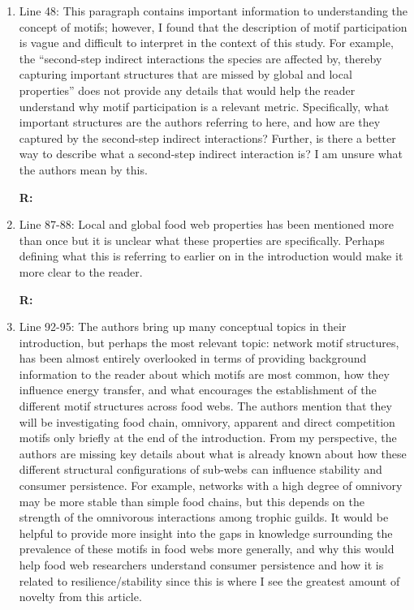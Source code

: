 \documentclass[12pt]{article}
\begin{document}
\begin{enumerate}
            \item Line 48: This paragraph contains important information to understanding the concept of motifs; however, I found that the description of motif participation is vague and difficult to interpret in the context of this study. For example, the “second-step indirect interactions the species are affected by, thereby capturing important structures that are missed by global and local properties” does not provide any details that would help the reader understand why motif participation is a relevant metric. Specifically, what important structures are the authors referring to here, and how are they captured by the second-step indirect interactions? Further, is there a better way to describe what a second-step indirect interaction is? I am unsure what the authors mean by this.

                \textbf{R:}

            
            \item Line 87-88: Local and global food web properties has been mentioned more than once but it is unclear what these properties are specifically. Perhaps defining what this is referring to earlier on in the introduction would make it more clear to the reader.

                \textbf{R:}

            
            \item Line 92-95: The authors bring up many conceptual topics in their introduction, but perhaps the most relevant topic: network motif structures, has been almost entirely overlooked in terms of providing background information to the reader about which motifs are most common, how they influence energy transfer, and what encourages the establishment of the different motif structures across food webs. The authors mention that they will be investigating food chain, omnivory, apparent and direct competition motifs only briefly at the end of the introduction. From my perspective, the authors are missing key details about what is already known about how these different structural configurations of sub-webs can influence stability and consumer persistence. For example, networks with a high degree of omnivory may be more stable than simple food chains, but this depends on the strength of the omnivorous interactions among trophic guilds. It would be helpful to provide more insight into the gaps in knowledge surrounding the prevalence of these motifs in food webs more generally, and why this would help food web researchers understand consumer persistence and how it is related to resilience/stability since this is where I see the greatest amount of novelty from this article.


\end{enumerate}
\end{document}

